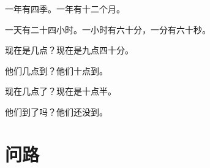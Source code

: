\documentclass[12pt,UTF-8,openany]{ctexbook}
\begin{document}
\begin{large}
    
    一年有四季。一年有十二个月。
    
    一天有二十四小时。一小时有六十分，一分有六十秒。
    
    现在是几点？现在是九点四十分。
    
    他们几点到？他们十点到。
    
    现在几点了？现在是十点半。
    
    他们到了吗？他们还没到。
    
\end{large}


\clearpage

\begin{center}
    
\end{center}


\hanzibox{}\hanzibox{}\hanzibox{}\hanzibox{}\hspace{1em}\hanzibox{}\hanzibox{}\hanzibox{}\hanzibox{}

\hanzibox{}\hanzibox{}\hanzibox{}\hanzibox{}\hspace{1em}\hanzibox{}\hanzibox{}\hanzibox{}\hanzibox{}

\hanzibox{}\hanzibox{}\hanzibox{}\hanzibox{}\hspace{1em}\hanzibox{}\hanzibox{}\hanzibox{}\hanzibox{}

\hanzibox{}\hanzibox{}\hanzibox{}\hanzibox{}\hspace{1em}\hanzibox{}\hanzibox{}\hanzibox{}\hanzibox{}






\chapter{问路}
\end{document}
